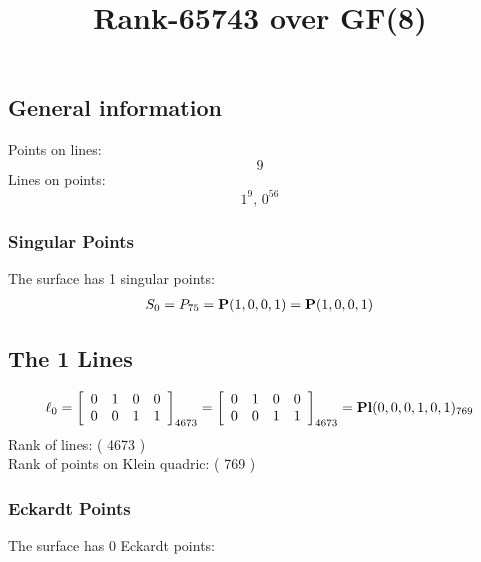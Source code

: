 \documentclass{article}
\newcommand\setTBstruts{\def\T{\rule{0pt}{2.6ex}}%
\def\B{\rule[-1.2ex]{0pt}{0pt}}}
\newcommand{\bP}{{\bf P}}
\begin{document}
 
\setTBstruts



{\allowdisplaybreaks%






\title{Rank-65743 over GF(8)}
\author{}%
\maketitle%
%
{}



\subsection*{General information}
Points on lines:
$$
9$$
Lines on points:
$$
1^9,\,0^{56}$$
\subsubsection*{Singular Points}
The surface has 1 singular points:\\
\begin{align*}
S_{0} &= P_{75}=\bP(1, 0, 0, 1) = \bP(1, 0, 0, 1)\\
\end{align*}
\subsection*{The 1 Lines}
$$
\ell_{0} = 
\left[
\begin{array}{*{4}{r}}
0 & 1 & 0 & 0\\
0 & 0 & 1 & 1\\
\end{array}
\right]
_{4673}
=
\left[
\begin{array}{*{4}c}
0  & 1  & 0  & 0\\
0  & 0  & 1  & 1\\
\end{array}
\right]_{4673}
={\rm\bf Pl}(0,0,0,1,0,1 )_{769}$$
Rank of lines: ( 4673 )\\
Rank of points on Klein quadric: ( 769 )\\
\subsubsection*{Eckardt Points}
The surface has 0 Eckardt points:\\
}
\end{document}
